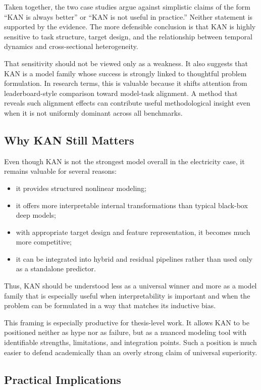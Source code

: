 \documentclass[10pt,conference,onecolumn]{IEEEtran}
\begin{document}
Taken together, the two case studies argue against simplistic claims of the form ``KAN is always better'' or ``KAN is not useful in practice.'' Neither statement is supported by the evidence. The more defensible conclusion is that KAN is highly sensitive to task structure, target design, and the relationship between temporal dynamics and cross-sectional heterogeneity.

That sensitivity should not be viewed only as a weakness. It also suggests that KAN is a model family whose success is strongly linked to thoughtful problem formulation. In research terms, this is valuable because it shifts attention from leaderboard-style comparison toward model-task alignment. A method that reveals such alignment effects can contribute useful methodological insight even when it is not uniformly dominant across all benchmarks.

\subsection{Why KAN Still Matters}

Even though KAN is not the strongest model overall in the electricity case, it remains valuable for several reasons:
\begin{itemize}
    \item it provides structured nonlinear modeling;
    \item it offers more interpretable internal transformations than typical black-box deep models;
    \item with appropriate target design and feature representation, it becomes much more competitive;
    \item it can be integrated into hybrid and residual pipelines rather than used only as a standalone predictor.
\end{itemize}

Thus, KAN should be understood less as a universal winner and more as a model family that is especially useful when interpretability is important and when the problem can be formulated in a way that matches its inductive bias.

This framing is especially productive for thesis-level work. It allows KAN to be positioned neither as hype nor as failure, but as a nuanced modeling tool with identifiable strengths, limitations, and integration points. Such a position is much easier to defend academically than an overly strong claim of universal superiority.

\subsection{Practical Implications}
\end{document}
